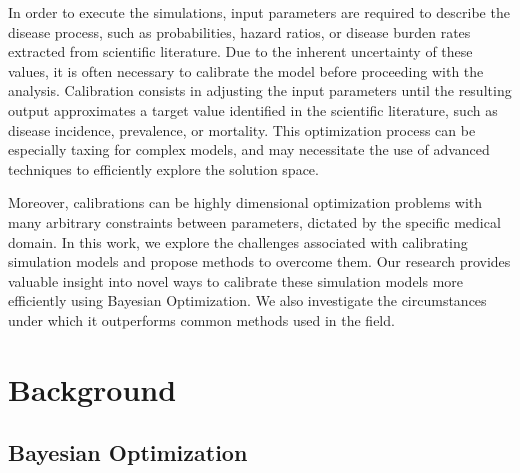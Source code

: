 \documentclass{IOS-Book-Article}
\begin{document}

	
In order to execute the simulations, input parameters are required to describe the disease process, such as probabilities, hazard ratios, or disease burden rates extracted from scientific literature. Due to the inherent uncertainty of these values, it is often necessary to calibrate the model before proceeding with the analysis. Calibration consists in adjusting the input parameters until the resulting output approximates a target value identified in the scientific literature, such as disease incidence, prevalence, or mortality. This optimization process can be especially taxing for complex models, and may necessitate the use of advanced techniques to efficiently explore the solution space.

Moreover, calibrations can be highly dimensional optimization problems with many arbitrary constraints between parameters, dictated by the specific medical domain. In this work, we explore the challenges associated with calibrating simulation models and propose methods to overcome them. Our research provides valuable insight into novel ways to calibrate these simulation models more efficiently using Bayesian Optimization. We also investigate the circumstances under which it outperforms common methods used in the field.	


\section{Background}

\subsection{Bayesian Optimization}
\end{document}
